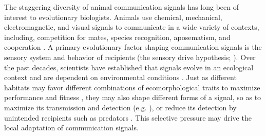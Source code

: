 
The staggering diversity of animal communication signals has long been of interest to evolutionary biologists. Animals use chemical, mechanical, electromagnetic, and visual signals to communicate in a wide variety of contexts, including, competition for mates, species recognition, aposematism, and cooperation \citep{Bradbury2011}. A primary evolutionary factor shaping communication signals is the sensory system and behavior of recipients (the sensory drive hypothesis; \citealt{Endler1988,Endler1992,Endler1998}). Over the past decades, scientists have established that signals evolve in an ecological context and are dependent on environmental conditions \citep{Endler1992,Endler1993,Endler1993a}. Just as different habitats may favor different combinations of ecomorphological traits to maximize performance and fitness \citep{Arnold1983}, they may also shape different forms of a signal, so as to maximize its transmission and detection (e.g. \citealt{Seehausen1997}), or reduce its detection by unintended recipients such as predators \citep{Endler1984,Endler1990,Endler1991,Halfwerk2014}. This selective pressure may drive the local adaptation of communication signals.\\


